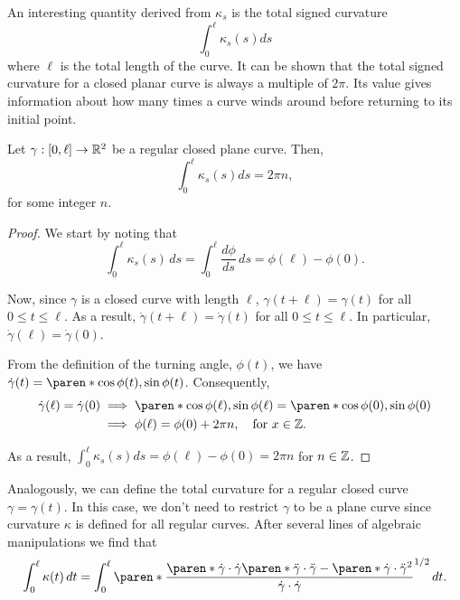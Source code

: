 \documentclass[11pt]{penrose}
\begin{document}
An interesting quantity derived from $\kappa_s$ is the total signed curvature
\begin{equation}
    \int_0^\ell \kappa_s (s) ds
\end{equation}
where $\ell$ is the total length of the curve. It can be shown that the total signed curvature for a closed planar curve is always a multiple of $2\pi$. Its value gives information about how many times a curve winds around before returning to its initial point.

\begin{nprop}
    Let $\gamma : [0, \ell] \to \mathbb{R}^2$ be a regular closed plane curve. Then,
    \begin{equation}
        \int_0^\ell \kappa_s (s) ds = 2\pi n,
    \end{equation}
    for some integer $n$.
\end{nprop}
\begin{proof}
    We start by noting that
    \begin{equation}
        \int_0^\ell \kappa_s (s) \,ds
        = \int_0^\ell \frac{d\phi}{ds} \,ds
        = \phi(\ell) - \phi(0).
    \end{equation}

    Now, since $\gamma$ is a closed curve with length $\ell$, $\gamma(t + \ell) = \gamma(t)$ for all $0 \leq t \leq \ell$. As a result, $\dot{\gamma}(t + \ell) = \dot{\gamma}(t)$ for all $0 \leq t \leq \ell$. In particular, $\dot{\gamma}(\ell) = \dot{\gamma}(0)$.

    From the definition of the turning angle, $\phi(t)$, we have $\dot{\gamma}(t) = \paren*{ \cos\phi(t), \sin\phi(t) }$. Consequently,
    \begin{align}
        \dot{\gamma}(\ell) = \dot{\gamma}(0)
        &\implies \paren*{ \cos\phi(\ell), \sin\phi(\ell) } = \paren*{ \cos\phi(0), \sin\phi(0) }\\
        &\implies \phi(\ell) = \phi(0) + 2\pi n, \quad\text{for } x \in \Z.
    \end{align}

    As a result, $\int_0^\ell \kappa_s (s) ds = \phi(\ell) - \phi(0) = 2\pi n$ for $n \in \mathbb{Z}$.
\end{proof}

Analogously, we can define the total curvature for a regular closed curve $\gamma = \gamma(t)$. In this case, we don't need to restrict $\gamma$ to be a plane curve since curvature $\kappa$ is defined for all regular curves. After several lines of algebraic manipulations we find that
\begin{equation}
    \int_0^\ell \kappa(t) \,dt
    = \int_{0}^{\ell} \paren*{ \frac{ \paren*{\dot{\gamma}\cdot\dot{\gamma}}\paren*{\ddot{\gamma}\cdot\ddot{\gamma}} - \paren*{\dot{\gamma}\cdot\ddot{\gamma}}^2 }{ \dot{\gamma}\cdot\dot{\gamma} } }^{1/2} \,dt.
\end{equation}
\end{document}
